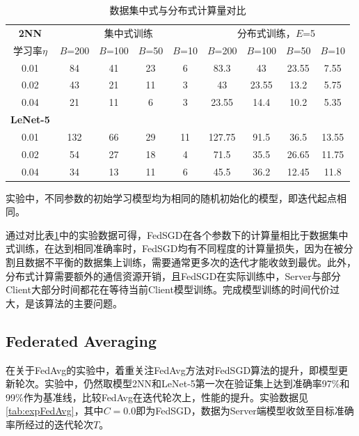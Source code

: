 \documentclass[zihao = -4,cn]{oucart}
\begin{document}
\begin{table}[!htbp] 
\caption{\label{tab:experiment}数据集中式与分布式计算量对比}
\begin{tabular}{ccccccccc} 
\toprule 
\textbf{2NN} & \multicolumn{4}{c}{集中式训练} & \multicolumn{4}{c}{分布式训练，$E$=5}\\ 
学习率$\eta$ & $B$=200 & $B$=100 & $B$=50 & $B$=10 & $B$=200 & $B$=100 & $B$=50 & $B$=10 \\
\midrule 
0.01 & 84 & 41 & 23 & 6 & 83.3 & 43 & 23.55 & 7.55 \\ 
0.02 & 43 & 21 & 11 & 3 & 43 & 23.55 & 13.2 & 5.75 \\ 
0.04 & 21 & 11 & 6  & 3 & 23.55 & 14.4 & 10.2 & 5.35 \\ 
\bottomrule
\textbf{LeNet-5} \\
\hline
0.01 & 132 & 66 & 29 & 11 & 127.75 & 91.5 & 36.5 & 13.55 \\ 
0.02 & 54 & 27 & 18 & 4 & 71.5 & 35.5 & 26.65 & 11.75 \\ 
0.04 & 34 & 13 & 11 & 6 & 45.5 & 36.2 & 12.45 & 11.8 \\ 
\hline
\end{tabular}
\footnotesize
\qquad 实验中，不同参数的初始学习模型均为相同的随机初始化的模型，即迭代起点相同。
\end{table}
通过对比表\ref{tab:experiment}中的实验数据可得，FedSGD在各个参数下的计算量相比于数据集中式训练，在达到相同准确率时，FedSGD均有不同程度的计算量损失，因为在被分割且数据不平衡的数据集上训练，需要通常更多次的迭代才能收敛到最优。此外，分布式计算需要额外的通信资源开销，且FedSGD在实际训练中，Server与部分Client大部分时间都花在等待当前Client模型训练。完成模型训练的时间代价过大，是该算法的主要问题。

\subsection{Federated Averaging}
在关于FedAvg的实验中，着重关注FedAvg方法对FedSGD算法的提升，即模型更新轮次。实验中，仍然取模型2NN和LeNet-5第一次在验证集上达到准确率97\%和99\%作为基准线，比较FedAvg在迭代轮次上，性能的提升。实验数据见\ref{tab:expFedAvg}，其中$C=0.0$即为FedSGD，数据为Server端模型收敛至目标准确率所经过的迭代轮次$T$。\par
\end{document}
